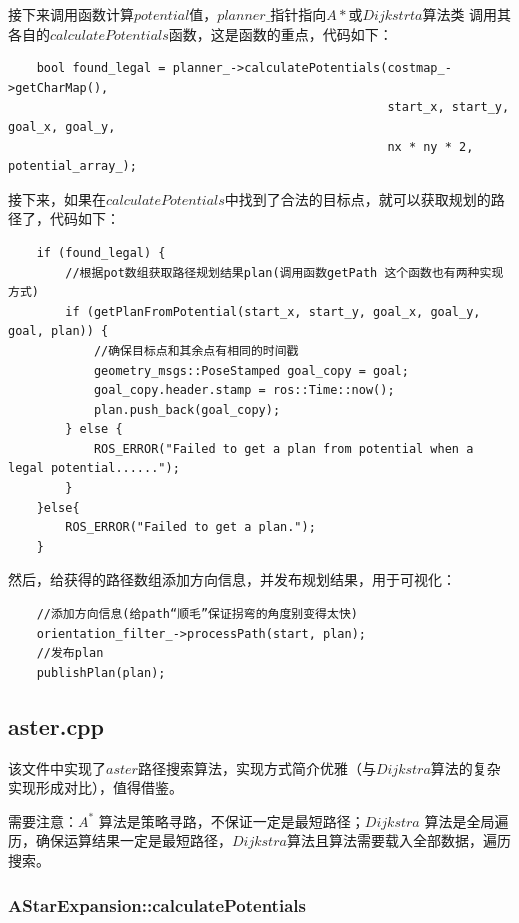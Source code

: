 \documentclass[9pt, oneside]{book}
\begin{document}
接下来调用函数计算$potential$值，$planner\_$指针指向$A*$或$Dijkstrta$算法类 调用其各自的$calculatePotentials$函数，这是函数的重点，代码如下：

\small
\begin{verbatim}
    bool found_legal = planner_->calculatePotentials(costmap_->getCharMap(), 
                                                     start_x, start_y, goal_x, goal_y,
                                                     nx * ny * 2, potential_array_);

\end{verbatim}
\normalsize

接下来，如果在$calculatePotentials$中找到了合法的目标点，就可以获取规划的路径了，代码如下：

\small
\begin{verbatim}
    if (found_legal) {
        //根据pot数组获取路径规划结果plan(调用函数getPath 这个函数也有两种实现方式)
        if (getPlanFromPotential(start_x, start_y, goal_x, goal_y, goal, plan)) {
            //确保目标点和其余点有相同的时间戳
            geometry_msgs::PoseStamped goal_copy = goal;
            goal_copy.header.stamp = ros::Time::now();
            plan.push_back(goal_copy);
        } else {
            ROS_ERROR("Failed to get a plan from potential when a legal potential......");
        }
    }else{
        ROS_ERROR("Failed to get a plan.");
    }
\end{verbatim}
\normalsize

然后，给获得的路径数组添加方向信息，并发布规划结果，用于可视化：

\small
\begin{verbatim}
    //添加方向信息(给path“顺毛”保证拐弯的角度别变得太快)
    orientation_filter_->processPath(start, plan);
    //发布plan
    publishPlan(plan);
\end{verbatim}
\normalsize

\subsection{aster.cpp}

该文件中实现了$aster$路径搜索算法，实现方式简介优雅（与$Dijkstra$算法的复杂实现形成对比），值得借鉴。

需要注意：$A^*$ 算法是策略寻路，不保证一定是最短路径；$Dijkstra$ 算法是全局遍历，确保运算结果一定是最短路径，$Dijkstra$算法且算法需要载入全部数据，遍历搜索。

\subsubsection{AStarExpansion::calculatePotentials}
\end{document}
